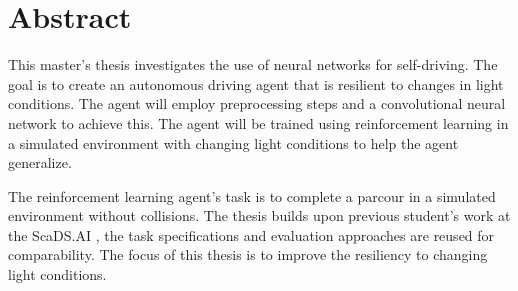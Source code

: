 \section*{Abstract}
\label{sec:Abstract}

This master's thesis investigates the use of neural networks for self-driving. The goal is to create an autonomous driving agent that is resilient to changes in light conditions. The agent will employ preprocessing steps and a convolutional neural network to achieve this. The agent will be trained using reinforcement learning in a simulated environment with changing light conditions to help the agent generalize.

The reinforcement learning agent's task is to complete a parcour in a simulated environment without collisions. The thesis builds upon previous student's work at the ScaDS.AI \autocite{maximilian}, the task specifications and evaluation approaches are reused for comparability. The focus of this thesis is to improve the resiliency to changing light conditions.

